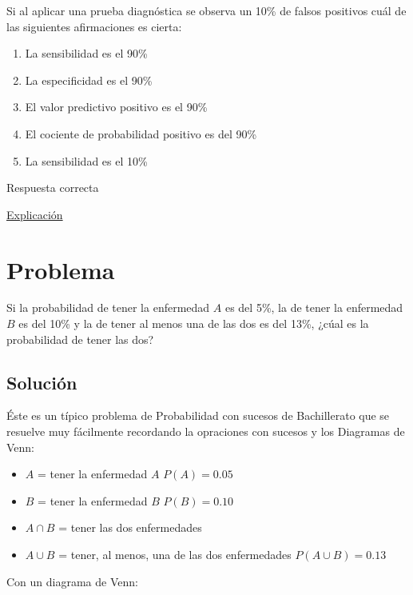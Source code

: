 \documentclass[
]{book}
\providecommand{\tightlist}{%
  \setlength{\itemsep}{0pt}\setlength{\parskip}{0pt}}
\begin{document}
Si al aplicar una prueba diagnóstica se observa un 10\% de falsos positivos cuál de las siguientes afirmaciones es cierta:

\begin{enumerate}
\def\labelenumi{\alph{enumi})}
\tightlist
\item
  La sensibilidad es el 90\%
\item
  La especificidad es el 90\%
\item
  El valor predictivo positivo es el 90\%
\item
  El cociente de probabilidad positivo es del 90\%
\item
  La sensibilidad es el 10\%
\end{enumerate}

Respuesta correcta

\href{https://1fjmanzano.github.io/bioestadistica/relaci\%C3\%B3n-entre-variables-cualitativas.html\#diagno\%CC\%81stico-cli\%CC\%81nico}{Explicación}

\hypertarget{problema-10}{%
\section{Problema}\label{problema-10}}

Si la probabilidad de tener la enfermedad \(A\) es del 5\%, la de tener la enfermedad \(B\) es del 10\% y la de tener al menos una de las dos es del 13\%, ¿cúal es la probabilidad de tener las dos?

\hypertarget{soluciuxf3n-8}{%
\subsection{Solución}\label{soluciuxf3n-8}}

Éste es un típico problema de Probabilidad con sucesos de Bachillerato que se resuelve muy fácilmente recordando la opraciones con sucesos y los Diagramas de Venn:

\begin{itemize}
\tightlist
\item
  \(A\) = tener la enfermedad \(A\) \(P(A)=0.05\)
\item
  \(B\) = tener la enfermedad \(B\) \(P(B)=0.10\)
\item
  \(A \cap B\) = tener las dos enfermedades
\item
  \(A \cup B\) = tener, al menos, una de las dos enfermedades \(P(A \cup B) = 0.13\)
\end{itemize}

Con un diagrama de Venn:
\end{document}
